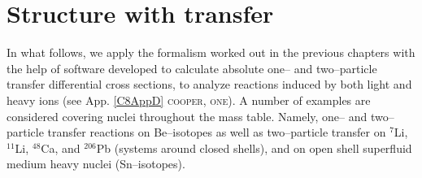  \chapter[Structure with two neutrons]{Structure with transfer}\label{C8}
 In what follows, we apply the formalism worked out in the previous chapters with the help of software developed to calculate absolute one-- and two--particle transfer differential cross sections, to analyze reactions induced by both light and heavy ions (see App. \ref{C8AppD} \textsc{cooper}, \textsc{one}).
 A number of examples are considered covering nuclei throughout the mass table. Namely, one-- and two-- particle transfer reactions on Be--isotopes as well as two--particle transfer on   $^{7}$Li, $^{11}$Li, $^{48}$Ca, and $^{206}$Pb (systems around closed shells), and on open shell superfluid medium heavy nuclei (Sn--isotopes).
